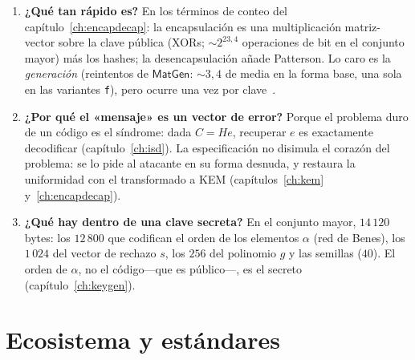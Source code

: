 \begin{enumerate}[leftmargin=1.9em,itemsep=5pt]
  \item \textbf{¿Qué tan rápido es?} En los términos de conteo del
        capítulo~\ref{ch:encapdecap}: la encapsulación es una
        multiplicación matriz-vector sobre la clave pública
        (XORs; $\sim2^{23{,}4}$ operaciones de bit en el conjunto
        mayor) más los hashes; la desencapsulación añade Patterson.
        Lo caro es la \emph{generación} (reintentos de
        $\textsf{MatGen}$: $\sim3{,}4$ de media en la forma base,
        una sola en las variantes \texttt{f}), pero ocurre una vez
        por clave~\cite{cmrationale}.

  \item \textbf{¿Por qué el «mensaje» es un vector de error?} Porque
        el problema duro de un código es el síndrome: dada
        $C=He$, recuperar $e$ es exactamente
        decodificar (capítulo~\ref{ch:isd}). La especificación no
        disimula el corazón del problema: se lo pide al atacante en
        su forma desnuda, y restaura la uniformidad con el
        transformado a KEM (capítulos~\ref{ch:kem}
        y~\ref{ch:encapdecap}).

  \item \textbf{¿Qué hay dentro de una clave secreta?} En el
        conjunto mayor, $14\,120$ bytes: los $12\,800$ que codifican
        el orden de los elementos $\alpha$ (red de Benes), los
        $1\,024$ del vector de rechazo $s$, los $256$ del polinomio
        $g$ y las semillas ($40$). El orden de $\alpha$, no el
        código---que es público---, es el secreto
        (capítulo~\ref{ch:keygen}).
\end{enumerate}

\section{Ecosistema y estándares}

